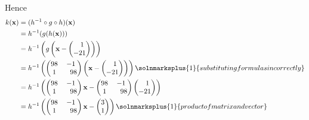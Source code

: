 Hence
\begin{align*}
	k(\mathbf{x}) & =(h^{-1}\circ g \circ h)(\mathbf{x})                \\&=h^{-1}(g(h(\mathbf{x})))\\
	              & =h^{-1}\left( g \left(\mathbf{x}-
	                                                 \begin{pmatrix}
		                                                 \phantom{-} 1 \\-21
	                                                 \end{pmatrix}
	\right)\right)                                                      \\
	              & =h^{-1}\left(
	                             \begin{pmatrix}
		                             98 & -1 \\1&\phantom{-} 98
	                             \end{pmatrix}
	\left(\mathbf{x}-
	                 \begin{pmatrix}
		                 \phantom{-} 1 \\-21
	                 \end{pmatrix}
	\right)\right)\solnmarksplus{1}{substituting formulas in correctly} \\
	              & =h^{-1}\left(
	                             \begin{pmatrix}
		                             98 & -1 \\1&\phantom{-} 98
	                             \end{pmatrix}
	\mathbf{x}-
	           \begin{pmatrix}
		           98 & -1 \\1& \phantom{-} 98
	           \end{pmatrix}
	\begin{pmatrix}
		\phantom{-} 1 \\-21
	\end{pmatrix}
	\right)                                                             \\
	              & =h^{-1}\left(
	                             \begin{pmatrix}
		                             98 & -1 \\1& \phantom{-} 98
	                             \end{pmatrix}
	\mathbf{x}-
	           \begin{pmatrix}
		           3 \\1
	           \end{pmatrix}
	\right)\solnmarksplus{1}{product of matrix and vector}              \\
\end{align*}
